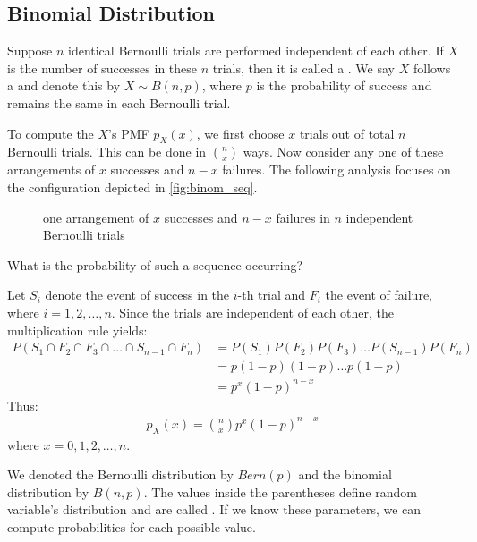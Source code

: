 \subsection{Binomial Distribution}

Suppose \( n \) identical Bernoulli trials are performed independent of each other.
If \( X \) is the number of successes in these \( n \) trials, then it is called a .
We say \( X \) follows a  and denote this by \( X \sim B(n, p) \),
where \( p \) is the probability of success and remains the same in each Bernoulli trial.

To compute the \( X \)'s PMF \( p_{X}(x) \),
we first choose \( x \) trials out of total \( n \) Bernoulli trials.
This can be done in \( n \choose x \) ways.
Now consider any one of these arrangements of \( x \) successes and \( n - x \) failures.
The following analysis focuses on the configuration depicted in \autoref{fig:binom_seq}.
\begin{figure}[t]
\begin{center}
\end{center}
\caption{one arrangement of \( x \) successes and \( n - x \) failures in \( n \) independent Bernoulli trials}
\label{fig:binom_seq}
\end{figure}
What is the probability of such a sequence occurring?

Let \( S_i \) denote the event of success in the \( i \)-th trial and \( F_i \) the event of failure, where \( i = 1, 2, \ldots, n \).
Since the trials are independent of each other, the multiplication rule yields:
\begin{align*}
    P(S_1 \cap F_2 \cap F_3 \cap \ldots \cap S_{n - 1} \cap F_{n}) &= P(S_1)P(F_2)P(F_3)\ldots P(S_{n - 1})P(F_n)\\
    &= p(1 - p)(1 - p)\ldots p(1 - p)\\
    &= p^{x}(1 - p)^{n - x}
\end{align*}
Thus:
\begin{gather*}
    p_{X}(x) = \binom{n}{x} p^{x}(1 - p)^{n - x}
\end{gather*}
where \( x = 0, 1, 2, \ldots, n \).

We denoted the Bernoulli distribution by \( Bern(p) \) and the binomial distribution by \( B(n, p) \).
The values inside the parentheses define random variable's distribution and are called .
If we know these parameters, we can compute probabilities for each possible value.

